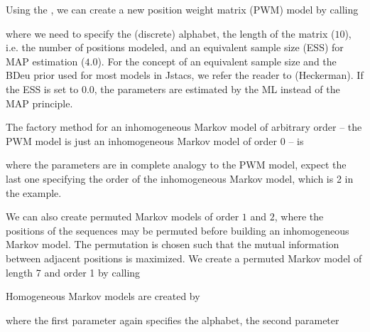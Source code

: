 Using the \TrainSMFactory, we can create a new position weight matrix (PWM) model by calling
\addtocounter{off}{10}
where we need to specify the (discrete) alphabet, the length of the matrix ($10$), i.e. the number of positions modeled, and an equivalent sample size (ESS) for MAP estimation ($4.0$). For the concept of an equivalent sample size and the BDeu prior used for most models in Jstacs, we refer the reader to (Heckerman). If the ESS is set to $0.0$, the parameters are estimated by the ML instead of the MAP principle.

The factory method for an inhomogeneous Markov model of arbitrary order -- the PWM model is just an inhomogeneous Markov model of order 0 -- is
\addtocounter{off}{1}
where the parameters are in complete analogy to the PWM model, expect the last one specifying the order of the inhomogeneous Markov model, which is 2 in the example.

We can also create permuted Markov models of order $1$ and $2$, where the positions of the sequences may be permuted before building an inhomogeneous Markov model. The permutation is chosen such that the mutual information between adjacent positions is maximized. We create a permuted Markov model of length 7 and order 1 by calling
\addtocounter{off}{1}

Homogeneous Markov models are created by
\addtocounter{off}{1}
where the first parameter again specifies the alphabet, the second parameter 

\addtocounter{off}{1}

\addtocounter{off}{3}

\addtocounter{off}{3}

\addtocounter{off}{3}

\addtocounter{off}{3}

\addtocounter{off}{5}

\addtocounter{off}{6}

\addtocounter{off}{3}

\addtocounter{off}{3}

\addtocounter{off}{3}

\addtocounter{off}{3}
